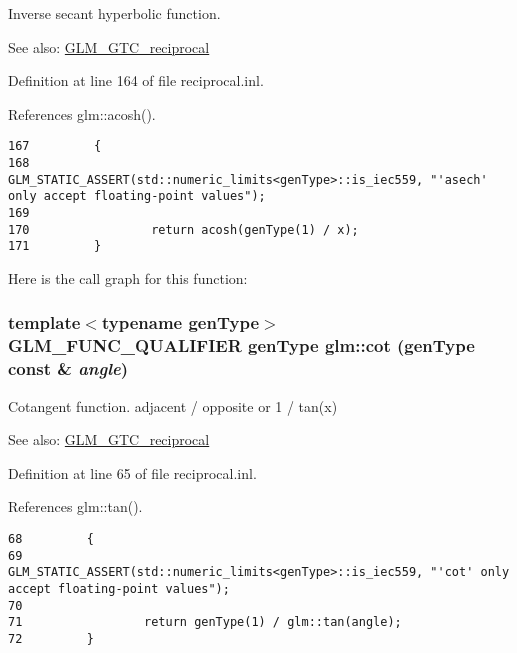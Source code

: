 Inverse secant hyperbolic function.

\begin{Desc}
\item[See also:]\hyperlink{group__gtc__reciprocal}{GLM\_\-GTC\_\-reciprocal} \end{Desc}


Definition at line 164 of file reciprocal.inl.

References glm::acosh().

\begin{Code}\begin{verbatim}167         {
168                 GLM_STATIC_ASSERT(std::numeric_limits<genType>::is_iec559, "'asech' only accept floating-point values");
169 
170                 return acosh(genType(1) / x);
171         }
\end{verbatim}
\end{Code}




Here is the call graph for this function:\hypertarget{group__gtc__reciprocal_g8d3b73a481ad1115ca93da1410868e10}{
\subsubsection[cot]{\setlength{\rightskip}{0pt plus 5cm}template$<$typename genType$>$ GLM\_\-FUNC\_\-QUALIFIER genType glm::cot (genType const \& {\em angle})}}
\label{group__gtc__reciprocal_g8d3b73a481ad1115ca93da1410868e10}


Cotangent function. adjacent / opposite or 1 / tan(x)

\begin{Desc}
\item[See also:]\hyperlink{group__gtc__reciprocal}{GLM\_\-GTC\_\-reciprocal} \end{Desc}


Definition at line 65 of file reciprocal.inl.

References glm::tan().

\begin{Code}\begin{verbatim}68         {
69                 GLM_STATIC_ASSERT(std::numeric_limits<genType>::is_iec559, "'cot' only accept floating-point values");
70 
71                 return genType(1) / glm::tan(angle);
72         }
\end{verbatim}
\end{Code}




